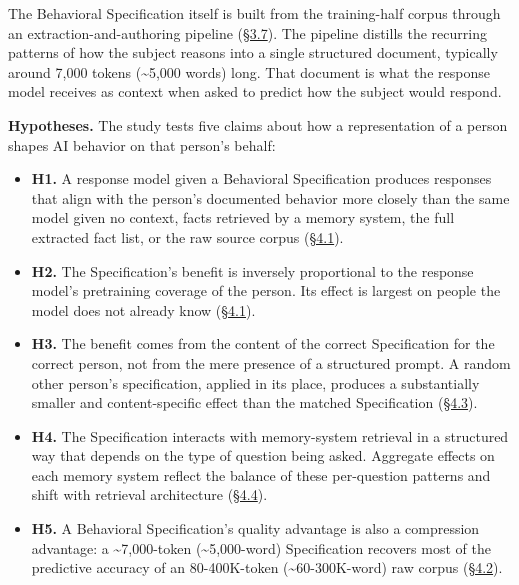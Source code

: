 The Behavioral Specification itself is built from the training-half
corpus through an extraction-and-authoring pipeline (\hyperref[pipeline-for-the-behavioral-specification]{§3.7}). The pipeline
distills the recurring patterns of how the subject reasons into a single
structured document, typically around 7,000 tokens (\textasciitilde5,000
words) long. That document is what the response model receives as
context when asked to predict how the subject would respond.

\textbf{Hypotheses.} The study tests five claims about how a
representation of a person shapes AI behavior on that person's behalf:

\begin{itemize}
\tightlist
\item
  \textbf{H1.} A response model given a Behavioral Specification
  produces responses that align with the person's documented behavior
  more closely than the same model given no context, facts retrieved by
  a memory system, the full extracted fact list, or the raw source
  corpus (\hyperref[the-cross-subject-gradient-and-its-per-question-mechanism]{§4.1}).
\item
  \textbf{H2.} The Specification's benefit is inversely proportional to
  the response model's pretraining coverage of the person. Its effect is
  largest on people the model does not already know (\hyperref[the-cross-subject-gradient-and-its-per-question-mechanism]{§4.1}).
\item
  \textbf{H3.} The benefit comes from the content of the correct
  Specification for the correct person, not from the mere presence of a
  structured prompt. A random other person's specification, applied in
  its place, produces a substantially smaller and content-specific
  effect than the matched Specification (\hyperref[mechanism-correct-content-not-format]{§4.3}).
\item
  \textbf{H4.} The Specification interacts with memory-system retrieval
  in a structured way that depends on the type of question being asked.
  Aggregate effects on each memory system reflect the balance of these
  per-question patterns and shift with retrieval architecture (\hyperref[memory-system-composition]{§4.4}).
\item
  \textbf{H5.} A Behavioral Specification's quality advantage is also a
  compression advantage: a \textasciitilde7,000-token
  (\textasciitilde5,000-word) Specification recovers most of the
  predictive accuracy of an 80-400K-token (\textasciitilde60-300K-word)
  raw corpus (\hyperref[compression-structure-vs.-raw-text]{§4.2}).
\end{itemize}

